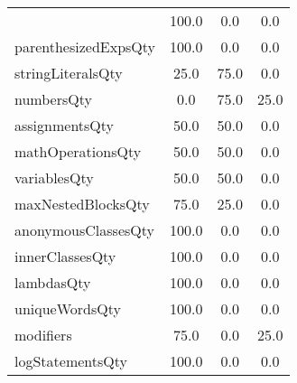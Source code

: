 \begin{tabular}{lccc}
{tryCatchQty & 100.0 & 0.0 & 0.0 \\
parenthesizedExpsQty & 100.0 & 0.0 & 0.0 \\
stringLiteralsQty & 25.0 & 75.0 & 0.0 \\
numbersQty & 0.0 & 75.0 & 25.0 \\
assignmentsQty & 50.0 & 50.0 & 0.0 \\
mathOperationsQty & 50.0 & 50.0 & 0.0 \\
variablesQty & 50.0 & 50.0 & 0.0 \\
maxNestedBlocksQty & 75.0 & 25.0 & 0.0 \\
anonymousClassesQty & 100.0 & 0.0 & 0.0 \\
innerClassesQty & 100.0 & 0.0 & 0.0 \\
lambdasQty & 100.0 & 0.0 & 0.0 \\
uniqueWordsQty & 100.0 & 0.0 & 0.0 \\
modifiers & 75.0 & 0.0 & 25.0 \\
logStatementsQty & 100.0 & 0.0 & 0.0 \\
\bottomrule
              \end{tabular}
            